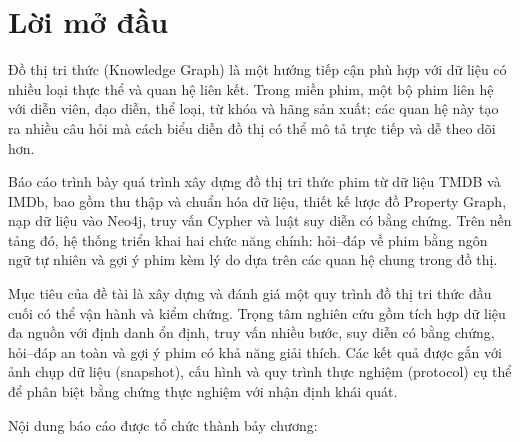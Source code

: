 \chapter*{Lời mở đầu}

Đồ thị tri thức (Knowledge Graph) là một hướng tiếp cận phù hợp với dữ liệu có nhiều loại thực thể
và quan hệ liên kết. Trong miền phim, một bộ phim liên hệ với diễn viên, đạo diễn,
thể loại, từ khóa và hãng sản xuất; các quan hệ này tạo ra nhiều câu hỏi mà cách
biểu diễn đồ thị có thể mô tả trực tiếp và dễ theo dõi hơn.

Báo cáo trình bày quá trình xây dựng đồ thị tri thức phim từ dữ liệu TMDB và
IMDb, bao gồm thu thập và chuẩn hóa dữ liệu, thiết kế lược đồ Property Graph,
nạp dữ liệu vào Neo4j, truy vấn Cypher và luật suy diễn có bằng chứng.
Trên nền tảng đó, hệ thống triển khai hai chức năng chính: hỏi–đáp về phim bằng
ngôn ngữ tự nhiên và gợi ý phim kèm lý do dựa trên các quan hệ chung trong đồ thị.

Mục tiêu của đề tài là xây dựng và đánh giá một quy trình đồ thị tri thức đầu
cuối có thể vận hành và kiểm chứng. Trọng tâm nghiên cứu gồm tích hợp dữ liệu đa
nguồn với định danh ổn định, truy vấn nhiều bước, suy diễn có bằng chứng, hỏi–đáp
an toàn và gợi ý phim có khả năng giải thích. Các kết quả được gắn với ảnh chụp
dữ liệu (snapshot), cấu hình và quy trình thực nghiệm (protocol) cụ thể để phân
biệt bằng chứng thực nghiệm với nhận định
khái quát.

Nội dung báo cáo được tổ chức thành bảy chương:

